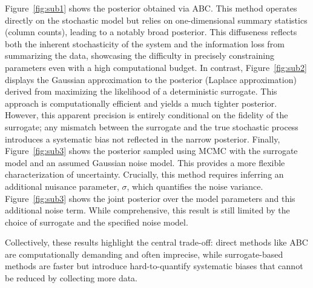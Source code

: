 \documentclass{article}
\providecommand{\DIFaddtex}[1]{{\protect\color{blue} \sf #1}} %
\providecommand{\DIFadd}[1]{\texorpdfstring{\DIFaddtex{#1}}{#1}} %
\begin{document}
\DIFadd{Figure~\ref{fig:sub1} shows the posterior obtained via ABC. This method operates directly on the stochastic model but relies on one-dimensional summary statistics (column counts), leading to a notably broad posterior. This diffuseness reflects both the inherent stochasticity of the system and the information loss from summarizing the data, showcasing the difficulty in precisely constraining parameters even with a high computational budget. In contrast, Figure~\ref{fig:sub2} displays the Gaussian approximation to the posterior (Laplace approximation) derived from maximizing the likelihood of a deterministic surrogate. This approach is computationally efficient and yields a much tighter posterior. However, this apparent precision is entirely conditional on the fidelity of the surrogate; any mismatch between the surrogate and the true stochastic process introduces a systematic bias not reflected in the narrow posterior. Finally, Figure~\ref{fig:sub3} shows the posterior sampled using MCMC with the surrogate model and an assumed Gaussian noise model. This provides a more flexible characterization of uncertainty. Crucially, this method requires inferring an additional nuisance parameter, $\sigma$, which quantifies the noise variance. Figure~\ref{fig:sub3} shows the joint posterior over the model parameters and this additional noise term. While comprehensive, this result is still limited by the choice of surrogate and the specified noise model.
}

\DIFadd{Collectively, these results highlight the central trade-off: direct methods like ABC are computationally demanding and often imprecise, while surrogate-based methods are faster but introduce hard-to-quantify systematic biases that cannot be reduced by collecting more data.
}
\end{document}
